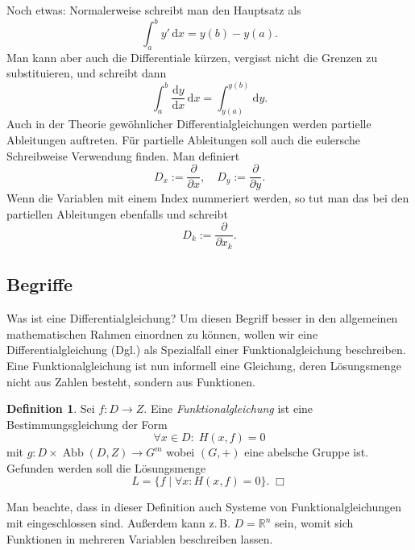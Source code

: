 \documentclass[a4paper,10pt,fleqn,twocolumn,twoside,openany]{article}
\numberwithin{equation}{section}
\newcommand{\R}{\mathbb R}
\theoremstyle{definition}
\newtheorem{Definition}{Definition}
\begin{document}
Noch etwas: Normalerweise schreibt man den Hauptsatz als
\begin{equation}
\int_a^b y'\,\mathrm dx = y(b)-y(a).
\end{equation}
Man kann aber auch die Differentiale {\glqq}kürzen{\grqq},
vergisst nicht die Grenzen zu substituieren, und schreibt dann
\begin{equation}
\int_a^b \frac{\mathrm dy}{\mathrm dx}\,\mathrm dx
= \int_{y(a)}^{y(b)}\mathrm dy.
\end{equation}
Auch in der Theorie gewöhnlicher Differentialgleichungen werden
partielle Ableitungen auftreten. Für partielle Ableitungen soll
auch die eulersche Schreibweise Verwendung finden. Man definiert
\begin{equation}
D_x := \frac{\partial}{\partial x},\quad
D_y := \frac{\partial}{\partial y}.
\end{equation}
Wenn die Variablen mit einem Index nummeriert werden, so
tut man das bei den partiellen Ableitungen ebenfalls und schreibt
\begin{equation}
D_k := \frac{\partial}{\partial x_k}.
\end{equation}

\subsection{Begriffe}
Was ist eine Differentialgleichung? Um diesen Begriff besser in den
allgemeinen mathematischen Rahmen einordnen zu können, wollen wir eine
Differentialgleichung (Dgl.) als Spezialfall einer Funktionalgleichung
beschreiben. Eine Funktionalgleichung ist nun informell eine Gleichung,
deren Lösungsmenge nicht aus Zahlen besteht, sondern aus Funktionen.

\begin{Definition}
Sei $f\colon D\to Z$. Eine \emph{Funktionalgleichung} ist
eine Bestimmungsgleichung der Form
\begin{equation}\label{eq:Funktionalgleichung}
\forall x{\in}D\colon\;H(x,f)=0
\end{equation}
mit $g\colon D\times\operatorname{Abb}(D,Z)\to G^m$ wobei $(G,+)$
eine abelsche Gruppe ist. Gefunden werden soll die
Lösungsmenge%
\begin{equation}
L = \{f\mid\forall x\colon H(x,f)=0\}.\;\Box
\end{equation}
\end{Definition}
\noindent
Man beachte, dass in dieser Definition auch Systeme
von Funktionalgleichungen
mit eingeschlossen sind. Außerdem kann z.\,B. $D=\R^n$ sein, womit
sich Funktionen in mehreren Variablen beschreiben lassen.
\end{document}
